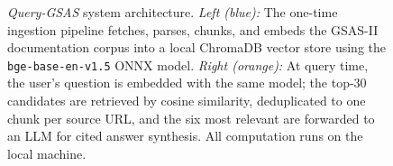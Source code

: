 \begin{figure}[htbp]
\caption{\textit{Query-GSAS} system architecture.
  \textit{Left (blue):} The one-time ingestion pipeline fetches, parses,
  chunks, and embeds the GSAS-II documentation corpus into a local
  ChromaDB vector store using the \texttt{bge-base-en-v1.5} ONNX model.
  \textit{Right (orange):} At query time, the user's question is embedded
  with the same model; the top-30 candidates are retrieved by cosine
  similarity, deduplicated to one chunk per source URL, and the six
  most relevant are forwarded to an LLM for cited answer synthesis.
  All computation runs on the local machine.}
\label{fig:architecture}
\end{figure}
